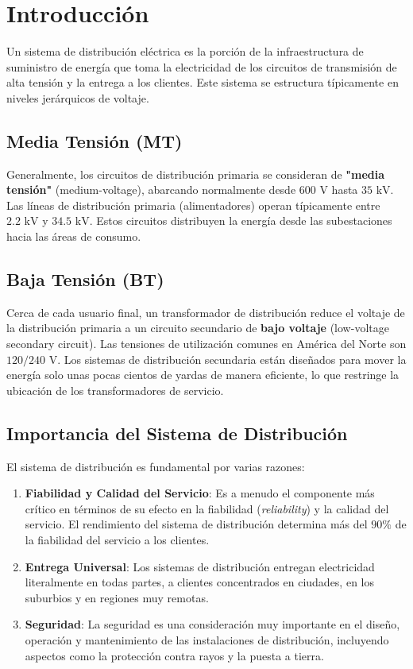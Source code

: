 
\section*{Introducción}


Un sistema de distribución eléctrica es la porción de la infraestructura de suministro de energía que toma la electricidad de los circuitos de transmisión de alta tensión y la entrega a los clientes. Este sistema se estructura típicamente en niveles jerárquicos de voltaje.

\subsection*{Media Tensión (MT)}
Generalmente, los circuitos de distribución primaria se consideran de \textbf{"media tensión"} (medium-voltage), abarcando normalmente desde $600 \text{ V}$ hasta $35 \text{ kV}$. Las líneas de distribución primaria (alimentadores) operan típicamente entre $2.2 \text{ kV}$ y $34.5 \text{ kV}$. Estos circuitos distribuyen la energía desde las subestaciones hacia las áreas de consumo.

\subsection*{Baja Tensión (BT)}
Cerca de cada usuario final, un transformador de distribución reduce el voltaje de la distribución primaria a un circuito secundario de \textbf{bajo voltaje} (low-voltage secondary circuit). Las tensiones de utilización comunes en América del Norte son $120/240 \text{ V}$. Los sistemas de distribución secundaria están diseñados para mover la energía solo unas pocas cientos de yardas de manera eficiente, lo que restringe la ubicación de los transformadores de servicio.

\subsection*{Importancia del Sistema de Distribución}
El sistema de distribución es fundamental por varias razones:
\begin{enumerate}
    \item \textbf{Fiabilidad y Calidad del Servicio}: Es a menudo el componente más crítico en términos de su efecto en la fiabilidad (\textit{reliability}) y la calidad del servicio. El rendimiento del sistema de distribución determina más del $90\%$ de la fiabilidad del servicio a los clientes.
    \item \textbf{Entrega Universal}: Los sistemas de distribución entregan electricidad literalmente en todas partes, a clientes concentrados en ciudades, en los suburbios y en regiones muy remotas.
    \item \textbf{Seguridad}: La seguridad es una consideración muy importante en el diseño, operación y mantenimiento de las instalaciones de distribución, incluyendo aspectos como la protección contra rayos y la puesta a tierra.
\end{enumerate}


